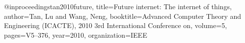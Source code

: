 \begin{thebibliography}{9}

@inproceedings{tan2010future,
  title={Future internet: The internet of things},
  author={Tan, Lu and Wang, Neng},
  booktitle={Advanced Computer Theory and Engineering (ICACTE), 2010 3rd International Conference on},
  volume={5},
  pages={V5--376},
  year={2010},
  organization={IEEE}
}




\end{thebibliography}